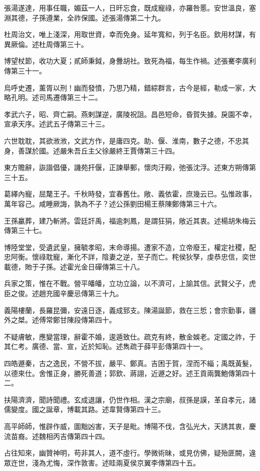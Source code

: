 \begin{pinyinscope}
張湯遂達，用事任職，媚茲一人，日旰忘食，既成寵祿，亦羅咎慝。安世溫良，塞淵其德，子孫遵業，全祚保國。述張湯傳第二十九。

杜周治文，唯上淺深，用取世資，幸而免身。延年寬和，列于名臣。欽用材謀，有異厥倫。述杜周傳第三十。

博望杖節，收功大夏；貳師秉鉞，身釁胡社。致死為福，每生作禍。述張騫李廣利傳第三十一。

烏呼史遷，薰胥以刑！幽而發憤，乃思乃精，錯綜群言，古今是經，勒成一家，大略孔明。述司馬遷傳第三十二。

孝武六子，昭、齊亡嗣。燕剌謀逆，廣陵祝詛。昌邑短命，昏賀失據。戾園不幸，宣承天序。述武五子傳第三十三。

六世耽耽，其欲浟浟，文武方作，是庸四克。助、偃、淮南，數子之德，不忠其身，善謀於國。述嚴朱吾丘主父徐嚴終王賈傳第三十四。

東方贍辭，詼諧倡優，譏苑扞偃，正諫舉郵，懷肉汙殿，弛張沈浮。述東方朔傳第三十五。

葛繹內寵，屈氂王子。千秋時發，宜春舊仕。敞、義依霍，庶幾云已。弘惟政事，萬年容己。咸睡厥誨，孰為不子？述公孫劉田楊王蔡陳鄭傳第三十六。

王孫臝葬，建乃斬將。雲廷訐禹，福逾刺鳳，是謂狂狷，敞近其衷。述楊胡朱梅云傳第三十七。

博陸堂堂，受遺武皇，擁毓孝昭，末命導揚。遭家不造，立帝廢王，權定社稷，配忠阿衡。懷祿耽寵，漸化不詳，陰妻之逆，至子而亡。秺侯狄孥，虔恭忠信，奕世載德，貤于子孫。述霍光金日磾傳第三十八。

兵家之策，惟在不戰。營平皤皤，立功立論，以不濟可，上諭其信。武賢父子，虎臣之俊。述趙充國辛慶忌傳第三十九。

義陽樓蘭，長羅昆彌，安遠日逐，義成郅支。陳湯誕節，救在三悊；會宗勤事，疆外之桀。述傅常鄭甘陳段傳第四十。

不疑膚敏，應變當理，辭霍不婚，逡遁致仕。疏克有終，散金娛老。定國之祚，于其仁考。廣德、當、宣，近於知恥。述雋疏于薛平彭傳第四十一。

四皓遯秦，古之逸民，不營不拔，嚴平、鄭真。吉困于賀，涅而不緇；禹既黃髮，以德來仕。舍惟正身，勝死善道；郭欽、蔣詡，近遯之好。述王貢兩龔鮑傳第四十二。

扶陽濟濟，聞詩聞禮。玄成退讓，仍世作相。漢之宗廟，叔孫是謨，革自孝元，諸儒變度。國之誕章，博載其路。述韋賢傳第四十三。

高平師師，惟辟作威，圖黜凶害，天子是毗。博陽不伐，含弘光大，天誘其衷，慶流苗裔。述魏相丙吉傳第四十四。

占往知來，幽贊神明，苟非其人，道不虛行。學微術昧，或見仿佛，疑殆匪闕，違眾迕世，淺為尤悔，深作敦害。述眭兩夏侯京翼李傳第四十五。


\end{pinyinscope}
